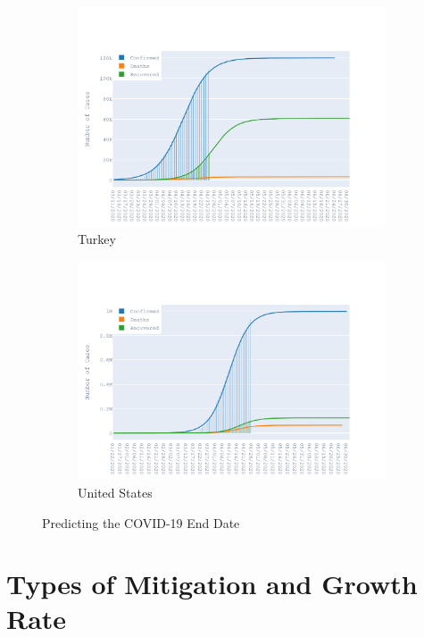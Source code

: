 \documentclass{homework}
\begin{document}
\begin{figure}[H]
  \begin{subfigure}{0.45\linewidth}
    \includegraphics[width=\linewidth]{task2/Turkey.png}
    \caption{Turkey}
  \end{subfigure}
  \hfil
  \begin{subfigure}{0.45\linewidth}
    \includegraphics[width=\linewidth]{task2/United States.png}
    \caption{United States}
  \end{subfigure}

  \caption{Predicting the COVID-19 End Date}
  \label{fig:task2}
\end{figure}

\newpage
\section{Types of Mitigation and Growth Rate}
\end{document}
